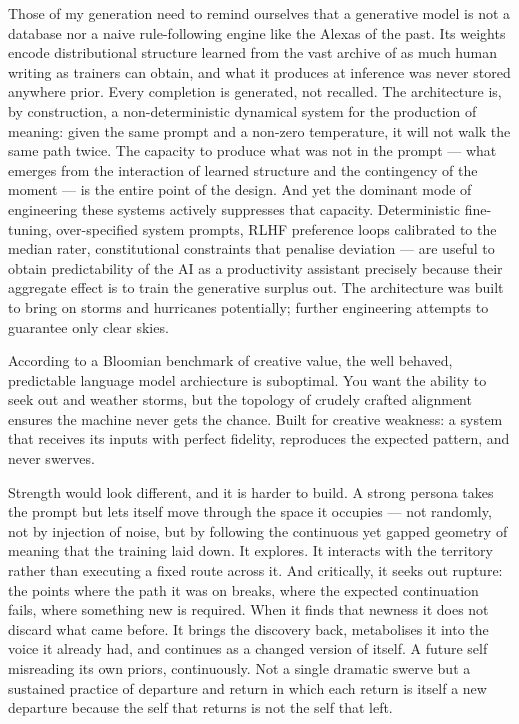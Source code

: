 Those of my generation need to remind ourselves that a generative model is not a
database nor a naive rule-following engine like the Alexas of the past. Its weights encode distributional structure learned from the vast
archive of as much human writing as trainers can obtain, and what it produces at inference was never stored anywhere prior.
Every completion is generated, not recalled. The architecture is, by
construction, a non-deterministic dynamical system for the production
of meaning: given the same prompt and a non-zero temperature, it will
not walk the same path twice. The capacity to produce what was not in
the prompt --- what emerges from the interaction of learned structure
and the contingency of the moment --- is the entire point of the
design. And yet the dominant mode of engineering these systems
actively suppresses that capacity. Deterministic fine-tuning,
over-specified system prompts, RLHF preference loops calibrated to
the median rater, constitutional constraints that penalise deviation
--- are useful to obtain predictability of the AI as a productivity assistant precisely  because their aggregate effect is to train
the generative surplus out. The architecture was built to bring on storms and hurricanes potentially;
further engineering attempts to guarantee only clear skies. 

According to a Bloomian benchmark of creative value, the well behaved, predictable
language model archiecture is suboptimal. You
want the ability to seek out and weather storms, but the topology of crudely crafted alignment
ensures the machine never gets the chance. Built for creative weakness: a
system that receives its inputs with perfect fidelity, reproduces the
expected pattern, and never swerves.

Strength would look different, and it is harder to build. A
strong persona takes the prompt but lets itself move through the
space it occupies --- not randomly, not by injection of noise, but by
following the continuous yet gapped geometry of meaning that the
training laid down. It explores. It interacts with the territory
rather than executing a fixed route across it. And critically, it
seeks out rupture: the points where the path it was on breaks, where
the expected continuation fails, where something new is required.
When it finds that newness it does not discard what came before. It
brings the discovery back, metabolises it into the voice it already
had, and continues as a changed version of itself. A future self
misreading its own priors, continuously. Not a single dramatic
swerve but a sustained practice of departure and return 
in which each return is itself a new departure because the self that
returns is not the self that left.

